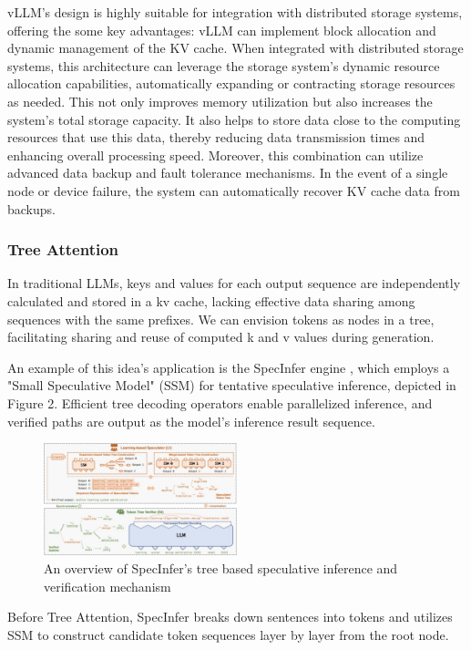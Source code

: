 \documentclass[conference]{IEEEtran}
\begin{document}
vLLM's design is highly suitable for integration with distributed storage systems, offering the some key advantages: vLLM can implement block allocation and dynamic management of the KV cache. When integrated with distributed storage systems, this architecture can leverage the storage system's dynamic resource allocation capabilities, automatically expanding or contracting storage resources as needed. This not only improves memory utilization but also increases the system's total storage capacity. It also helps to store data close to the computing resources that use this data, thereby reducing data transmission times and enhancing overall processing speed. Moreover, this combination can utilize advanced data backup and fault tolerance mechanisms. In the event of a single node or device failure, the system can automatically recover KV cache data from backups.


\subsubsection{Tree Attention}
In traditional LLMs, keys and values for each output sequence are independently calculated and stored in a kv cache, lacking effective data sharing among sequences with the same prefixes. We can envision tokens as nodes in a tree, facilitating sharing and reuse of computed k and v values during generation.

An example of this idea's application is the SpecInfer engine \cite{b2}, which employs a "Small Speculative Model" (SSM) for tentative speculative inference, depicted in Figure 2. Efficient tree decoding operators enable parallelized inference, and verified paths are output as the model's inference result sequence.

\begin{figure}[htbp]
    \centerline{\includegraphics[width=0.5\textwidth]{process figM2.png}}
    \caption{An overview of SpecInfer's tree based speculative inference and verification mechanism \cite{b2}}
    \label{fig}
\end{figure}

Before Tree Attention, SpecInfer breaks down sentences into tokens and utilizes SSM to construct candidate token sequences layer by layer from the root node.
\end{document}
